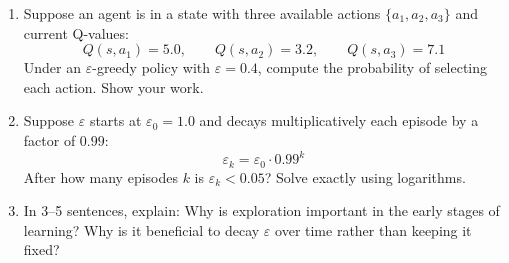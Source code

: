 \documentclass[12pt]{article}
\begin{document}
\begin{enumerate}[label=(\alph*)]
\item Suppose an agent is in a state with three available actions $\{a_1, a_2, a_3\}$ and current Q-values:
\[
Q(s, a_1) = 5.0, \qquad Q(s, a_2) = 3.2, \qquad Q(s, a_3) = 7.1
\]
Under an $\varepsilon$-greedy policy with $\varepsilon = 0.4$, compute the probability of selecting each action. Show your work.

\vspace{5cm}

\item Suppose $\varepsilon$ starts at $\varepsilon_0 = 1.0$ and decays multiplicatively each episode by a factor of $0.99$:
\[
\varepsilon_k = \varepsilon_0 \cdot 0.99^k
\]
After how many episodes $k$ is $\varepsilon_k < 0.05$? Solve exactly using logarithms.

\vspace{5cm}

\item In 3--5 sentences, explain: Why is exploration important in the early stages of learning? Why is it beneficial to decay $\varepsilon$ over time rather than keeping it fixed?

\vspace{5cm}
\end{enumerate}

\end{document}
